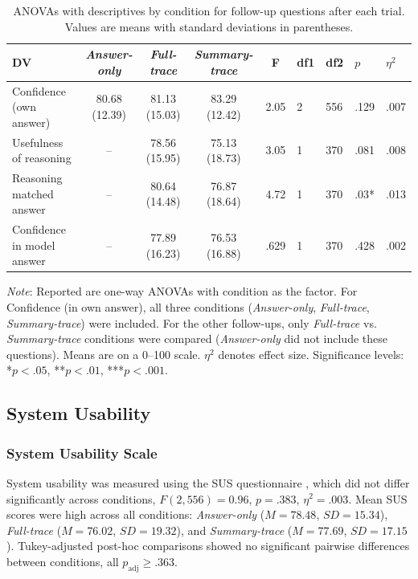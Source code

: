 \documentclass[manuscript, anonymous=false,authorversion,review=false]{acmart}
\begin{document}
\begin{table}[!htp]
\centering

\caption{ANOVAs with descriptives by condition for follow-up questions after each trial. Values are means with standard deviations in parentheses.}
\label{tab:follow_ups}
\begin{tabular}{lccccllll}
\hline DV             & \textit{Answer-only} & \textit{Full-trace}       & \textit{Summary-trace}    & F    & df1 & df2 & $p$     & $\eta^2$ \\ \hline
Confidence (own answer)   & 80.68 (12.39)  & 81.13 (15.03)  & 83.29 (12.42)  & 2.05 & 2  & 556 & .129  & .007     \\
Usefulness of reasoning   & --  & 78.56 (15.95)   & 75.13 (18.73)   & 3.05 & 1   & 370  & .081     &  .008  \\
Reasoning matched answer  & --  & 80.64 (14.48)  & 76.87 (18.64)  & 4.72 & 1   & 370  & .03*   & .013   \\
Confidence in model answer    & --   & 77.89 (16.23)   & 76.53 (16.88)   & .629 & 1   & 370  &  .428 & .002      \\
\hline
\end{tabular}

\raggedright \small  \textit{Note}: Reported are one-way ANOVAs with condition as the factor. For Confidence (in own answer), all three conditions (\textit{Answer-only}, \textit{Full-trace}, \textit{Summary-trace}) were included. For the other follow-ups, only \textit{Full-trace} vs. \textit{Summary-trace} conditions were compared (\textit{Answer-only }did not include these questions). Means are on a 0--100 scale. $\eta^2$ denotes effect size. Significance levels: *$p < .05$, **$p < .01$, ***$p < .001$.
\end{table}



\subsection{System Usability}

\subsubsection{System Usability Scale} System usability was measured using the SUS questionnaire \cite{brooke1996sus,bangor2008empirical}, which did not differ significantly across conditions, $F(2, 556) = 0.96$, $p = .383$, $\eta^2 = .003$. Mean SUS scores were high across all conditions: \textit{Answer-only} ($M = 78.48$, $SD = 15.34$), \textit{Full-trace} ($M = 76.02$, $SD = 19.32$), and \textit{Summary-trace} ($M = 77.69$, $SD = 17.15$). Tukey-adjusted post-hoc comparisons showed no significant pairwise differences between conditions, all $p_{\mathrm{adj}} \geq .363$.
\end{document}

